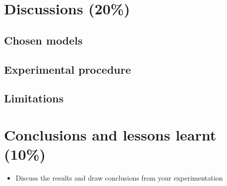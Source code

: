 \documentclass[twoside,11pt]{article}
\begin{document}
\section{Discussions (20\%)}
\subsection{Chosen models}
\subsection{Experimental procedure}
\subsection{Limitations}

\section{Conclusions and lessons learnt (10\%)}
\begin{itemize}
    \item Discuss the results and draw conclusions from your experimentation
\end{itemize}




\vskip 0.2in

\end{document}
